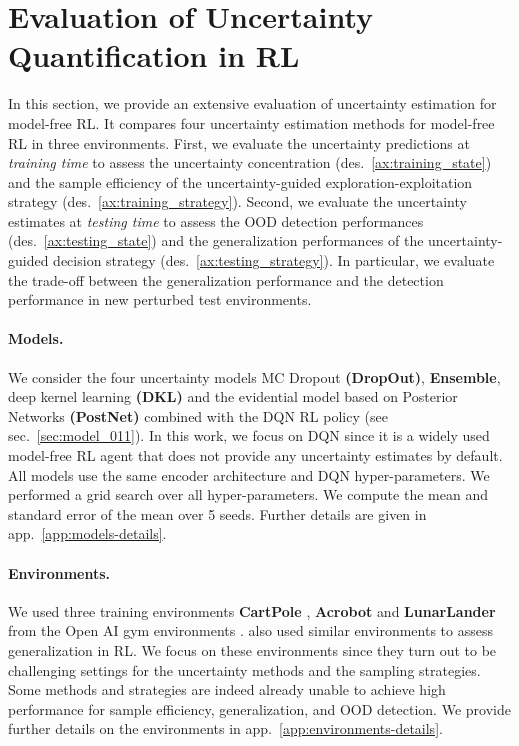 \vspace{-3mm}
\section{Evaluation of Uncertainty Quantification in RL}
\label{sec:experiments_011}

In this section, we provide an extensive evaluation of uncertainty estimation for model-free RL. It compares four uncertainty estimation methods for model-free RL in three environments. First, we evaluate the uncertainty predictions at \emph{training time} to assess the uncertainty concentration (des.~\ref{ax:training_state}) and the sample efficiency of the uncertainty-guided exploration-exploitation strategy (des.~\ref{ax:training_strategy}). Second, we evaluate the uncertainty estimates at \emph{testing time} to assess the OOD detection performances (des.~\ref{ax:testing_state}) and the generalization performances of the uncertainty-guided decision strategy (des.~\ref{ax:testing_strategy}). In particular, we evaluate the trade-off between the generalization performance and the detection performance in new perturbed test environments.

\paragraph{Models.} We consider the four uncertainty models MC Dropout \textbf{(DropOut)}, \textbf{Ensemble}, deep kernel learning \textbf{(DKL)} and the evidential model based on Posterior Networks \textbf{(PostNet)} combined with the DQN RL policy (see sec.~\ref{sec:model_011}). In this work, we focus on DQN \citep{dqn} since it is a widely used model-free RL agent that does not provide any uncertainty estimates by default. All models use the same encoder architecture and DQN hyper-parameters. We performed a grid search over all hyper-parameters. We compute the mean and standard error of the mean over 5 seeds. Further details are given in app.~\ref{app:models-details}.

\paragraph{Environments.} We used three training environments \textbf{CartPole} \citep{cartpole}, \textbf{Acrobot} \citep{acrobot1, acrobot2} and \textbf{LunarLander} \citep{lunarlander1} from the Open AI gym environments \citep{gym}. \citet{assessing-generalization-rl} also used similar environments to assess generalization in RL. We focus on these environments since they turn out to be challenging settings for the uncertainty methods and the sampling strategies. Some methods and strategies are indeed already unable to achieve high performance for sample efficiency, generalization, and OOD detection. We provide further details on the environments in app.~\ref{app:environments-details}. 

